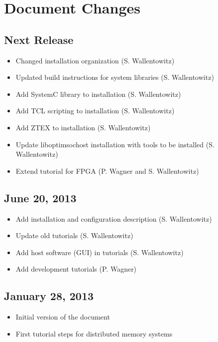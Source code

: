 \section*{Document Changes}


\subsection*{Next Release} %
\begin{itemize}
\item Changed installation organization (S. Wallentowitz)
\item Updated build instructions for system libraries (S. Wallentowitz)
\item Add SystemC library to installation (S. Wallentowitz)
\item Add TCL scripting to installation (S. Wallentowitz)
\item Add ZTEX to installation (S. Wallentowitz)
\item Update liboptimsochost installation with tools to be installed
  (S. Wallentowitz)
\item Extend tutorial for FPGA (P. Wagner and S. Wallentowitz)
\end{itemize}

\subsection*{June 20, 2013}
\begin{itemize}
\item Add installation and configuration description (S. Wallentowitz)
\item Update old tutorials (S. Wallentowitz)
\item Add host software (GUI) in tutorials (S. Wallentowitz)
\item Add development tutorials (P. Wagner) 
\end{itemize}

\subsection*{January 28, 2013}
\begin{itemize}
\item Initial version of the document
\item First tutorial steps for distributed memory systems
\end{itemize}